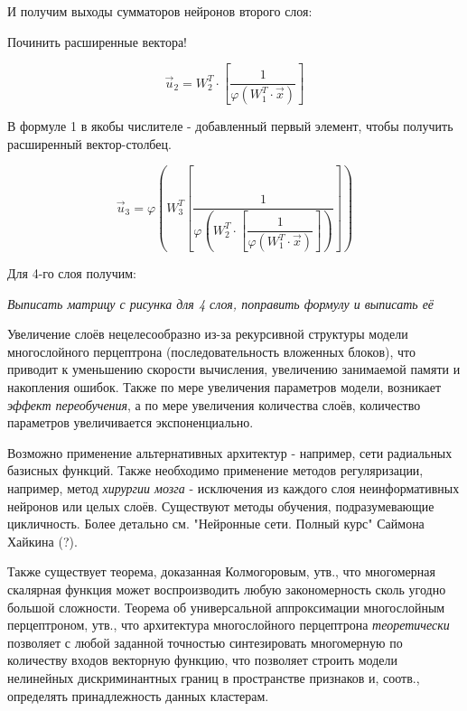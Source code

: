 \documentclass{article}
\begin{document}
И получим выходы сумматоров нейронов второго слоя:

\begin{myquote}
    Починить расширенные вектора!
\end{myquote}

\begin{equation}
    \vec{u}_2 = W_2^T \cdot [\dfrac{1}{\varphi(W_1^T \cdot \vec{x})}]
\end{equation}


В формуле 1 в якобы числителе - добавленный первый элемент, чтобы получить расширенный вектор-столбец.

\begin{equation}
    \vec{u}_3 = \varphi(W_3^T[\dfrac{1}{\varphi(W_2^T \cdot [\dfrac{1}{\varphi(W_1^T \cdot \vec{x})}])}])
\end{equation}

Для 4-го слоя получим:

\begin{myquote}
    \textit{Выписать матрицу с рисунка для 4 слоя, поправить формулу и выписать её}
\end{myquote}

Увеличение слоёв нецелесообразно из-за рекурсивной структуры модели многослойного перцептрона (последовательность вложенных блоков),
что приводит к уменьшению скорости вычисления, увеличению занимаемой памяти и накопления ошибок.
Также по мере увеличения параметров модели, возникает \textit{эффект переобучения}, а по мере увеличения количества слоёв, количество параметров увеличивается экспоненциально.

Возможно применение альтернативных архитектур - например, сети радиальных базисных функций.
Также необходимо применение методов регуляризации, например, метод \textit{хирургии мозга} - исключения из каждого слоя неинформативных нейронов или целых слоёв.
Существуют методы обучения, подразумевающие цикличность. Более детально см. "Нейронные сети. Полный курс" Саймона Хайкина (?).

Также существует теорема, доказанная Колмогоровым, утв., что многомерная скалярная функция может воспроизводить любую закономерность сколь угодно большой сложности. Теорема об универсальной аппроксимации многослойным перцептроном, утв., что архитектура многослойного перцептрона \textit{теоретически} позволяет с любой заданной точностью синтезировать
многомерную по количеству входов векторную функцию, что позволяет строить модели нелинейных дискриминантных границ в пространстве признаков и, соотв., определять принадлежность
данных кластерам. 
\end{document}
